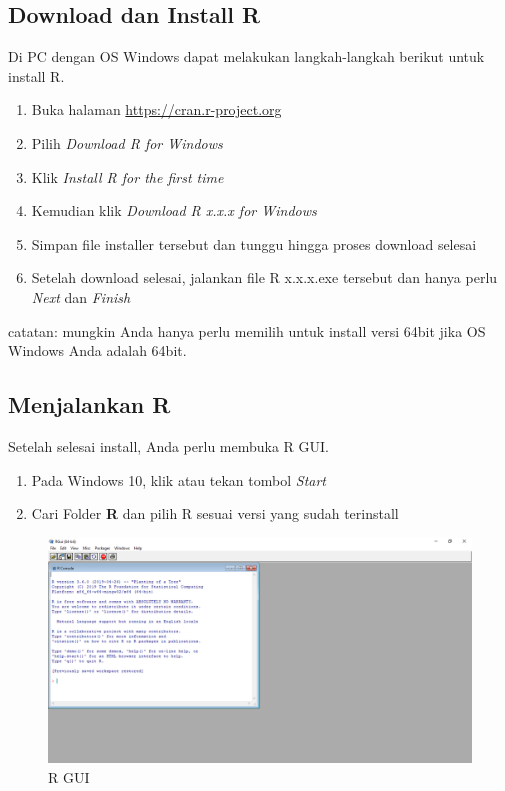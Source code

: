 \documentclass[]{book}
\providecommand{\tightlist}{%
  \setlength{\itemsep}{0pt}\setlength{\parskip}{0pt}}
\begin{document}
\hypertarget{download-dan-install-r}{%
\subsection{Download dan Install R}\label{download-dan-install-r}}

Di PC dengan OS Windows dapat melakukan langkah-langkah berikut untuk install R.

\begin{enumerate}
\def\labelenumi{\arabic{enumi}.}
\tightlist
\item
  Buka halaman \url{https://cran.r-project.org}
\item
  Pilih \emph{Download R for Windows}
\item
  Klik \emph{Install R for the first time}
\item
  Kemudian klik \emph{Download R x.x.x for Windows}
\item
  Simpan file installer tersebut dan tunggu hingga proses download selesai
\item
  Setelah download selesai, jalankan file R x.x.x.exe tersebut dan hanya perlu \emph{Next} dan \emph{Finish}
\end{enumerate}

catatan: mungkin Anda hanya perlu memilih untuk install versi 64bit jika OS Windows Anda adalah 64bit.

\hypertarget{menjalankan-r}{%
\subsection{Menjalankan R}\label{menjalankan-r}}

Setelah selesai install, Anda perlu membuka R GUI.

\begin{enumerate}
\def\labelenumi{\arabic{enumi}.}
\tightlist
\item
  Pada Windows 10, klik atau tekan tombol \emph{Start}
\item
  Cari Folder \textbf{R} dan pilih R sesuai versi yang sudah terinstall
\end{enumerate}

\begin{figure}

{\centering \includegraphics[width=18.97in]{RGUI} 

}

\caption{R GUI}\label{fig:unnamed-chunk-4}
\end{figure}
\end{document}
